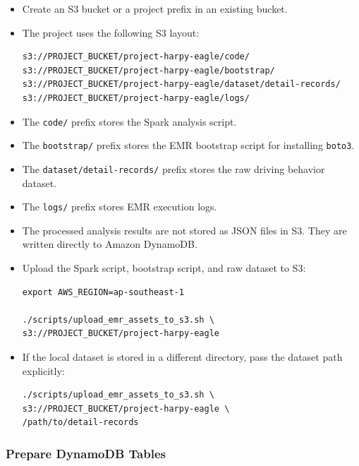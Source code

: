 \documentclass[12pt,a4paper]{article}
\begin{document}
\begin{itemize}
    \item Create an S3 bucket or a project prefix in an existing bucket.
    \item The project uses the following S3 layout:
\begin{lstlisting}
s3://PROJECT_BUCKET/project-harpy-eagle/code/
s3://PROJECT_BUCKET/project-harpy-eagle/bootstrap/
s3://PROJECT_BUCKET/project-harpy-eagle/dataset/detail-records/
s3://PROJECT_BUCKET/project-harpy-eagle/logs/
\end{lstlisting}

    \item The \texttt{code/} prefix stores the Spark analysis script.
    \item The \texttt{bootstrap/} prefix stores the EMR bootstrap script for installing \texttt{boto3}.
    \item The \texttt{dataset/detail-records/} prefix stores the raw driving behavior dataset.
    \item The \texttt{logs/} prefix stores EMR execution logs.
    \item The processed analysis results are not stored as JSON files in S3. They are written directly to Amazon DynamoDB.

    \item Upload the Spark script, bootstrap script, and raw dataset to S3:
\begin{lstlisting}
export AWS_REGION=ap-southeast-1

./scripts/upload_emr_assets_to_s3.sh \
s3://PROJECT_BUCKET/project-harpy-eagle
\end{lstlisting}

    \item If the local dataset is stored in a different directory, pass the dataset path explicitly:
\begin{lstlisting}
./scripts/upload_emr_assets_to_s3.sh \
s3://PROJECT_BUCKET/project-harpy-eagle \
/path/to/detail-records
\end{lstlisting}
\end{itemize}

\subsubsection{Prepare DynamoDB Tables}
\end{document}
